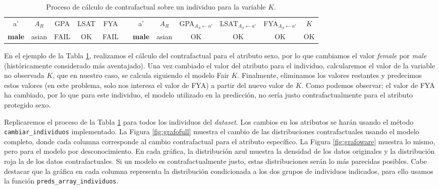 \documentclass[oneside,openright,titlepage,numbers=noenddot,openany,headinclude,footinclude=true,
cleardoublepage=empty,abstractoff,BCOR=5mm,paper=a4,fontsize=12pt,main=spanish]{scrreprt}
\begin{document}
\begin{table}[h]
{\begin{tabular}{ccccclcccccc}
\multicolumn{1}{|c|}{a'} & \multicolumn{1}{c|}{$A_R$}             & \multicolumn{1}{c|}{GPA}                         & \multicolumn{1}{c|}{LSAT}                      & \multicolumn{1}{c|}{FYA}                         & \multicolumn{1}{c|}{}          & \multicolumn{1}{c|}{a'} & \multicolumn{1}{c|}{$A_R$}             & \multicolumn{1}{c|}{GPA$_{A_S\leftarrow a'}$}      & \multicolumn{1}{c|}{LSAT$_{A_S\leftarrow a'}$}    & \multicolumn{1}{c|}{FYA$_{A_S\leftarrow a'}$}      & \multicolumn{1}{c|}{$K$}                       \\ \cline{1-5} \cline{7-12} 
\multicolumn{1}{|c|}{\textbf{male}}  & \multicolumn{1}{c|}{asian} & \multicolumn{1}{c|}{{\color[HTML]{FE0000} FAIL}} & \multicolumn{1}{c|}{{\color[HTML]{32CB00} OK}} & \multicolumn{1}{c|}{{\color[HTML]{FE0000} FAIL}} & \multicolumn{1}{l|}{}          & \multicolumn{1}{c|}{\textbf{male}}  & \multicolumn{1}{c|}{asian} & \multicolumn{1}{c|}{{\color[HTML]{32CB00} OK}}   & \multicolumn{1}{c|}{{\color[HTML]{32CB00} OK}} & \multicolumn{1}{c|}{{\color[HTML]{32CB00} OK}}   & \multicolumn{1}{c|}{{\color[HTML]{32CB00} OK}} \\ \cline{1-5} \cline{7-12} 
\end{tabular}
}
\caption{Proceso de cálculo de contrafactual sobre un individuo para la variable $K$.}
\label{tab:procesocontrafact}
\end{table}

En el ejemplo de la Tabla \ref{tab:procesocontrafact}, realizamos el cálculo del contrafactual para el atributo sexo, por lo que cambiamos el valor \textit{female} por \textit{male} (históricamente considerado más aventajado). Una vez cambiado el valor del atributo para el individuo, calcularemos el valor de la variable no observada $K$, que en nuestro caso, se calcula siguiendo el modelo Fair $K$. Finalmente, eliminamos los valores restantes y predecimos estos valores (en este problema, solo nos interesa el valor de FYA) a partir del nuevo valor de $K$. Como podemos observar; el valor de FYA ha cambiado, por lo que para este individuo, el modelo utilizado en la predicción, no sería justo contrafactualmente para el atributo protegido sexo.

\clearpage

Replicaremos el proceso de la Tabla \ref{tab:procesocontrafact} para todos los individuos del \textit{dataset}. Los cambios en los atributos se harán usando el método \texttt{cambiar\_individuos} implementado. La Figura \ref{fig:grafofull} muestra el cambio de las distribuciones contrafactuales usando el modelo completo, donde cada columna corresponde al cambio contrafactual para el atributo específico. La Figura \ref{fig:grafoware} muestra lo mismo, pero para el modelo por desconocimiento. En cada gráfica, la distribución azul muestra la densidad de los datos originales y la distribución roja la de los datos contrafactuales. Si un modelo es contrafactualmente justo, estas distribuciones serán lo más parecidas posibles. Cabe destacar que la gráfica en cada columna representa la distribución condicionada a los dos grupos de individuos indicados, para ello usamos la función \texttt{preds\_array\_individuos}.\\
\end{document}
